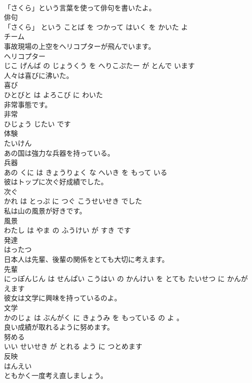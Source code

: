 \documentclass[8pt]{extreport}
\begin{document}
\begin{CJK}{UTF8}{min}
\\	「さくら」という言葉を使って俳句を書いたよ。	
\\	俳句 
\\	「さくら」 という ことば を つかって はいく を かいた よ			
\\	チーム	
\\	事故現場の上空をヘリコプターが飛んでいます。	
\\	ヘリコプター 
\\	じこ げんば の じょうくう を へりこぷたー が とんで います			
\\	人々は喜びに沸いた。	
\\	喜び 
\\	ひとびと は よろこび に わいた			
\\	非常事態です。	
\\	非常 
\\	ひじょう じたい です			
\\	体験	
\\	たいけん		
\\	あの国は強力な兵器を持っている。	
\\	兵器 
\\	あの くに は きょうりょく な へいき を もって いる			
\\	彼はトップに次ぐ好成績でした。	
\\	次ぐ 
\\	かれ は とっぷ に つぐ こうせいせき でした			
\\	私は山の風景が好きです。	
\\	風景 
\\	わたし は やま の ふうけい が すき です			
\\	発達	
\\	はったつ		
\\	日本人は先輩、後輩の関係をとても大切に考えます。	
\\	先輩 
\\	にっぽんじん は せんぱい こうはい の かんけい を とても たいせつ に かんがえます			
\\	彼女は文学に興味を持っているのよ。	
\\	文学 
\\	かのじょ は ぶんがく に きょうみ を もっている の よ 。			
\\	良い成績が取れるように努めます。	
\\	努める 
\\	いい せいせき が とれる よう に つとめます			
\\	反映	
\\	はんえい		
\\	ともかく一度考え直しましょう。	

\end{CJK}
\end{document}
